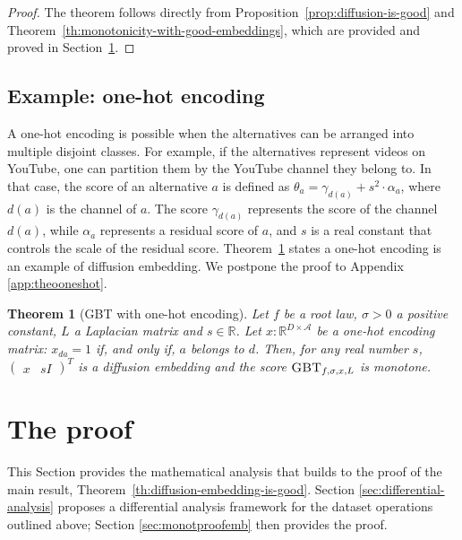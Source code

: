 \documentclass{article}
\newtheorem{theorem}{Theorem}
\newcommand{\GBT}{\textsc{GBT}}
\newcommand{\cA}{\mathcal A}
\begin{document}
\begin{proof}
    The theorem follows directly from Proposition~\ref{prop:diffusion-is-good} and Theorem~\ref{th:monotonicity-with-good-embeddings}, which are provided and proved in Section~\ref{sec:proof}.
\end{proof}




\subsection{Example: one-hot encoding}
\label{subsec:onehotencoding}

A one-hot encoding
is possible when the alternatives can be arranged into multiple disjoint
classes. For example, if the alternatives represent videos on YouTube,
one can partition them by the YouTube channel they belong to.
In that case,
the score of an alternative $a$ is defined as $\theta_a = \gamma_{d(a)} + s^2 \cdot \alpha_a$,
where $d(a)$ is the channel of $a$.
The score $\gamma_{d(a)}$ represents the score of the channel $d(a)$,
while $\alpha_a$ represents a residual score of $a$,
and $s$ is a real constant that controls the scale 
of the residual score. 
Theorem~\ref{theo:onehotencoding} states
a one-hot encoding is an example of diffusion embedding.
We postpone the proof to Appendix \ref{app:theooneshot}.

\begin{theorem}[GBT with one-hot encoding]
\label{theo:onehotencoding}
    Let $f$ be a root law,
    $\sigma > 0$ a positive constant,
    $L$ a Laplacian matrix and $s \in \mathbb{R}$.
    Let $x : \mathbb{R}^{D \times \cA}$
    be a \emph{one-hot encoding} matrix: $x_{da} = 1$ if, and only if, $a$ belongs to $d$.
    Then, for any real number $s$, 
    $\begin{pmatrix} x & sI \end{pmatrix}^T$ is a diffusion embedding
    and the score $\GBT_{f,\sigma,x,L}$ is monotone.
\end{theorem}



\section{The proof}
\label{sec:proof}

This Section provides the mathematical analysis that builds to the proof of the main result, Theorem~\ref{th:diffusion-embedding-is-good}.
Section \ref{sec:differential-analysis} proposes a differential analysis framework for the dataset operations outlined above; Section \ref{sec:monotproofemb} then provides the proof.
\end{document}

